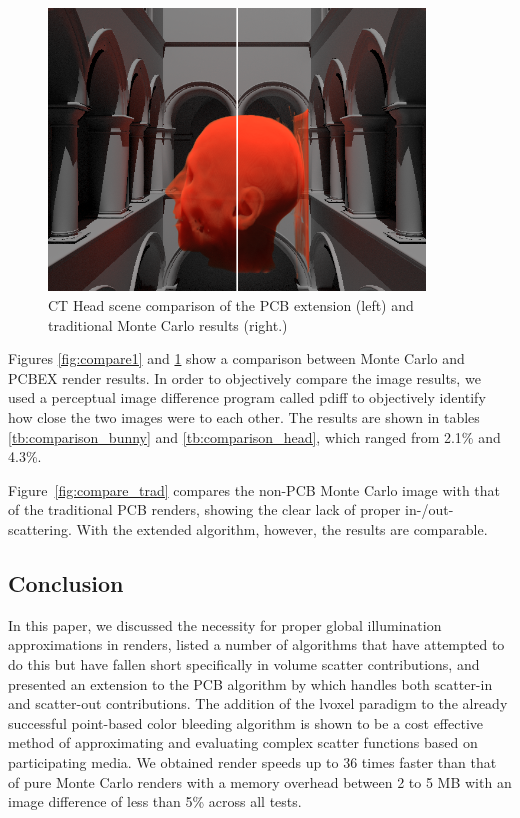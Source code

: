 \documentclass[runningheads]{llncs}
\begin{document}
\begin{figure}[h!]
    \centering
    \includegraphics[width=100mm]{img/compare_head.png}
    \caption{CT Head scene comparison of the PCB extension (left) and traditional Monte Carlo results (right.)}
    \label{fig:compare2}
\end{figure}

Figures \ref{fig:compare1} and \ref{fig:compare2} show a comparison between Monte Carlo and PCBEX render results.  In order to objectively compare the image results, we used a perceptual image difference program called pdiff to objectively identify how close the two images were to each other.  The results are shown in tables \ref{tb:comparison_bunny} and \ref{tb:comparison_head}, which ranged from 2.1\% and 4.3\%.


Figure~\ref{fig:compare_trad} compares the non-PCB Monte Carlo image with that of the traditional PCB renders, showing the clear lack of proper in-/out-scattering.  With the extended algorithm, however, the results are comparable.

\subsection{Conclusion}

In this paper, we discussed the necessity for proper global illumination approximations in renders, listed a number of algorithms that have attempted to do this but have fallen short specifically in volume scatter contributions, and presented an extension to the PCB algorithm by \cite{christensen:2008} which handles both scatter-in and scatter-out contributions.  The addition of the lvoxel paradigm to the already successful point-based color bleeding algorithm is shown to be a cost effective method of approximating and evaluating complex scatter functions based on participating media.  We obtained render speeds up to 36 times faster than that of pure Monte Carlo renders with a memory overhead between 2 to 5 MB with an image difference of less than 5\% across all tests.
\end{document}
